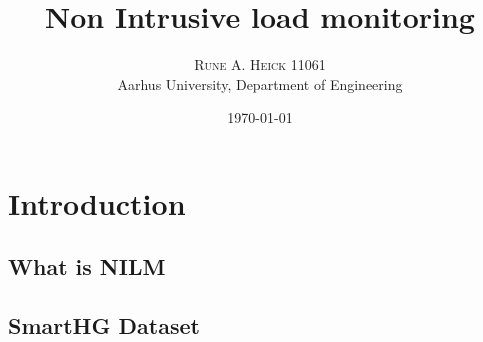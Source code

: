 


\title{\vspace{-15mm}\fontsize{24pt}{10pt}\selectfont\textbf{Non Intrusive load monitoring}} %

\author{
\large
\textsc{Rune A. Heick 11061}\\[2mm] %
\normalsize Aarhus University, Department of Engineering \\ %
\vspace{-5mm}
}
\date{\today}

\makeglossaries

\setlength{\abovedisplayskip}{1cm}
\setlength{\belowdisplayskip}{.8cm}
\maketitle %
\newpage\null\thispagestyle{empty}\newpage
\setcounter{page}{1}
\begin{abstract}
\lipsum[7] %
\end{abstract}

\printglossary[type=\acronymtype,title=Abbreviations]
\newpage
\listoffigures
\listoftables
\newpage
\tableofcontents


\chapter{Introduction}
\lipsum[1] %
\section{What is NILM}
\lipsum[4] %
\section{SmartHG Dataset}
\lipsum[3] %


